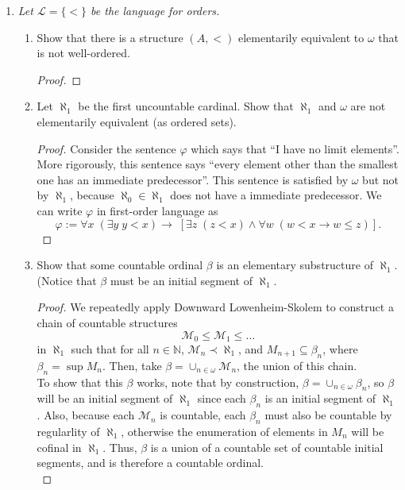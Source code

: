 \documentclass{article}
\begin{document}
\begin{enumerate}[label={\bf Q\arabic*:}]
  \item \it Let $\mathcal{L}=\{<\}$ be the language for orders.
    \begin{enumerate}[label={\bf(\arabic*)}]
      \item Show that there is a structure $(A,<)$ elementarily equivalent
        to $\omega$ that is not well-ordered.

        \begin{proof}
        \end{proof}

      \item Let $\aleph_1$ be the first uncountable cardinal. Show that
        $\aleph_1$ and $\omega$ are not elementarily equivalent (as ordered
        sets).
        \begin{proof}
          Consider the sentence $\varphi$ which says that ``I have no limit
          elements''. More rigorously, this sentence says ``every element
          other than the smallest one has an immediate predecessor''. This
          sentence is satisfied by $\omega$ but not by $\aleph_1$, because
          $\aleph_0\in\aleph_1$ does not have a immediate predecessor. We
          can write $\varphi$ in first-order language as
          \[\varphi:= \forall x\; (\exists y\; y<x)\rightarrow\;
            \left[\exists z\; (z<x)\wedge \forall w\; (w<x\rightarrow w\leq
            z) \right].\]
        \end{proof}

      \item Show that some countable ordinal $\beta$ is an elementary
        substructure of $\aleph_1$. (Notice that $\beta$ must be an initial
        segment of $\aleph_1$.

        \begin{proof}
          We repeatedly apply Downward Lowenheim-Skolem to
          construct a chain of countable structures
          \begin{equation*}
            \tag{$**$}
            \mathcal{M}_0\leq \mathcal{M}_1\leq\ldots
            \label{eqn:chain}
          \end{equation*}
          in $\aleph_1$ such that
          for all $n\in\mathbb{N}$, $\mathcal{M}_n\prec\aleph_1$, and
          $M_{n+1}\subseteq\beta_n$, where $\beta_n=\sup M_n$. Then,
          take $\beta=\cup_{n\in\omega}\mathcal{M}_n$, the union of this
          chain. \\

          To show that this $\beta$ works, note that by construction,
          $\beta=\cup_{n\in\omega}\beta_n$, so $\beta$ will be an initial
          segment of $\aleph_1$ since each $\beta_n$ is an initial segment
          of $\aleph_1$. Also, because each $\mathcal{M}_n$ is countable,
          each $\beta_n$ must also be countable by regularlity of
          $\aleph_1$, otherwise the enumeration of elements in $M_n$ will
          be cofinal in $\aleph_1$. Thus, $\beta$ is a union of a countable
          set of countable initial segments, and is therefore a countable
          ordinal. \\


\end{proof}
\end{enumerate}
\end{enumerate}
\end{document}
